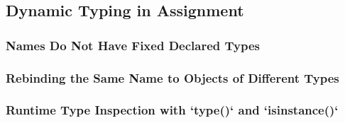 \subsection{Dynamic Typing in Assignment}
\subsubsection{Names Do Not Have Fixed Declared Types}
\subsubsection{Rebinding the Same Name to Objects of Different Types}
\subsubsection{Runtime Type Inspection with `type()` and `isinstance()`}
